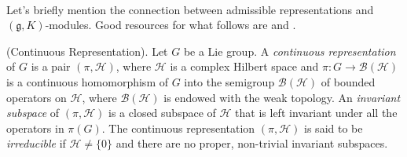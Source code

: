 

\noindent\\ Let's briefly mention the connection between admissible representations and $(\mathfrak{g}, K)$-modules. Good resources for what follows are \cite{Vog81} and \cite{Bin10}.\\

\noindent\begin{definition}\textup{(Continuous Representation).} Let $G$ be a Lie group. A {\em continuous representation} of $G$ is a pair $(\pi, \mathcal{H})$, where $\mathcal{H}$ is a complex Hilbert space and $\pi : G \to \mathcal{B}(\mathcal{H})$ is a continuous homomorphism of $G$ into the semigroup $\mathcal{B}(\mathcal{H})$ of bounded operators on $\mathcal{H}$, where $\mathcal{B}(\mathcal{H})$ is endowed with the weak topology. An {\em invariant subspace} of $(\pi, \mathcal{H})$ is a closed subspace of $\mathcal{H}$ that is left invariant under all the operators in $\pi(G)$. The continuous representation $(\pi, \mathcal{H})$ is said to be {\em irreducible} if $\mathcal{H} \neq \{0\}$ and there are no proper, non-trivial invariant subspaces.\newpage
\end{definition}

